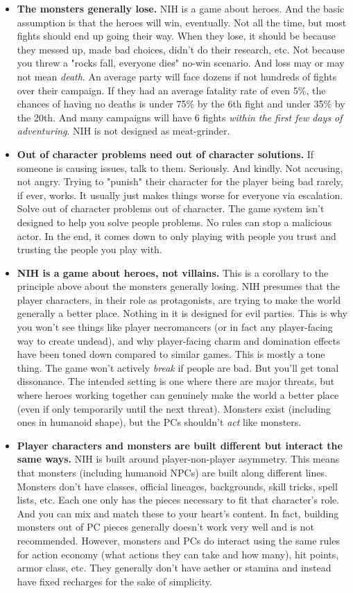 \documentclass[10pt,twoside,openany,bg=none]{dndbook}
\begin{document}
\begin{itemize}
    \item[] \textbf{The monsters generally lose.} NIH is a game about heroes. And the basic assumption is that the heroes will win, eventually. Not all the time, but most fights should end up going their way. When they lose, it should be because they messed up, made bad choices, didn't do their research, etc. Not because you threw a "rocks fall, everyone dies" no-win scenario. And loss may or may not mean \textit{death}. An average party will face dozens if not hundreds of fights over their campaign. If they had an average fatality rate of even 5\%, the chances of having no deaths is under 75\% by the 6th fight and under 35\% by the 20th. And many campaigns will have 6 fights \textit{within the first few days of adventuring}. NIH is not designed as meat-grinder.
    \item[] \textbf{Out of character problems need out of character solutions.} If someone is causing issues, talk to them. Seriously. And kindly. Not accusing, not angry. Trying to "punish" their character for the player being bad rarely, if ever, works. It usually just makes things worse for everyone via escalation.  Solve out of character problems out of character. The game system isn't designed to help you solve people problems. No rules can stop a malicious actor. In the end, it comes down to only playing with people you trust and trusting the people you play with.
    \item[] \textbf{NIH is a game about heroes, not villains.} This is a corollary to the principle above about the monsters generally losing. NIH presumes that the player characters, in their role as protagonists, are trying to make the world generally a better place. Nothing in it is designed for evil parties. This is why you won't see things like player necromancers (or in fact any player-facing way to create undead), and why player-facing charm and domination effects have been toned down compared to similar games. This is mostly a tone thing. The game won't actively \textit{break} if people are bad. But you'll get tonal dissonance. The intended setting is one where there are major threats, but where heroes working together can genuinely make the world a better place (even if only temporarily until the next threat). Monsters exist (including ones in humanoid shape), but the PCs shouldn't \textit{act} like monsters.
    \item[] \textbf{Player characters and monsters are built different but interact the same ways.} NIH is built around player-non-player asymmetry. This means that monsters (including humanoid NPCs) are built along different lines. Monsters don't have classes, official lineages, backgrounds, skill tricks, spell lists, etc. Each one only has the pieces necessary to fit that character's role. And you can mix and match these to your heart's content. In fact, building monsters out of PC pieces generally doesn't work very well and is not recommended. However, monsters and PCs do interact using the same rules for action economy (what actions they can take and how many), hit points, armor class, etc. They generally don't have aether or stamina and instead have fixed recharges for the sake of simplicity.
\end{itemize}
\end{document}
